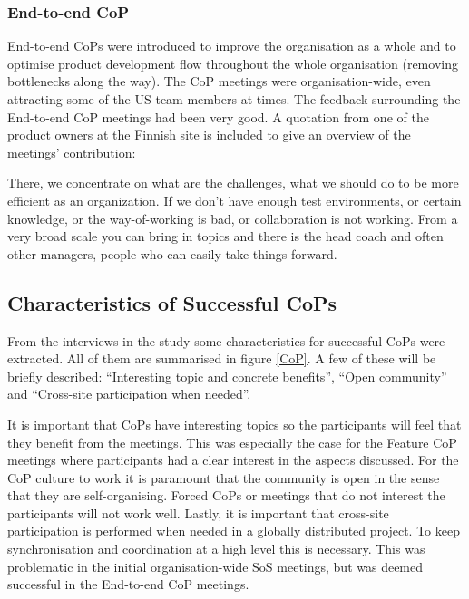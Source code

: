 \subsubsection{End-to-end CoP}

End-to-end CoPs were introduced to improve the organisation as a whole and to optimise product development flow throughout the whole organisation (removing bottlenecks along the way). The CoP meetings were organisation-wide, even attracting some of the US team members at times. The feedback surrounding the End-to-end CoP meetings had been very good. A quotation from one of the product owners at the Finnish site is included to give an overview of the meetings' contribution:

\begin{fancyquotes}
There, we concentrate on what are the challenges, what we should do to be more efficient as an organization. If we don’t have enough test environments, or certain knowledge, or the way-of-working is bad, or collaboration is not working. From a very broad scale you can bring in topics and there is the head coach and often other managers, people who can easily take things forward.
\end{fancyquotes}

\subsection{Characteristics of Successful CoPs}

From the interviews in the study some characteristics for successful CoPs were extracted. All of them are summarised in figure \ref{CoP}. A few of these will be briefly described: ``Interesting topic and concrete benefits'', ``Open community'' and ``Cross-site participation when needed''.

It is important that CoPs have interesting topics so the participants will feel that they benefit from the meetings. This was especially the case for the Feature CoP meetings where participants had a clear interest in the aspects discussed. For the CoP culture to work it is paramount that the community is open in the sense that they are self-organising. Forced CoPs or meetings that do not interest the participants will not work well. Lastly, it is important that cross-site participation is performed when needed in a globally distributed project. To keep synchronisation and coordination at a high level this is necessary. This was problematic in the initial organisation-wide SoS meetings, but was deemed successful in the End-to-end CoP meetings.

